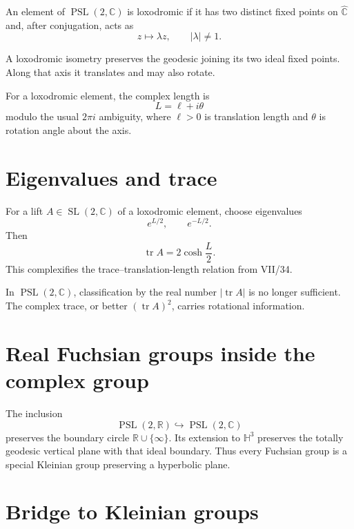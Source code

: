 \begin{definition}\label{def:vii36-loxodromic}
An element of \(\operatorname{PSL}(2,\mathbb C)\) is loxodromic if it has two distinct fixed points on \(\widehat{\mathbb C}\) and, after conjugation, acts as
\[
z\mapsto \lambda z,\qquad |\lambda|\ne1.
\]
\end{definition}

A loxodromic isometry preserves the geodesic joining its two ideal fixed points.  Along that axis it translates and may also rotate.

\begin{definition}\label{def:vii36-complex-length}
For a loxodromic element, the complex length is
\[
L=\ell+i\theta
\]
modulo the usual \(2\pi i\) ambiguity, where \(\ell>0\) is translation length and \(\theta\) is rotation angle about the axis.
\end{definition}


\section{Eigenvalues and trace}

For a lift \(A\in\operatorname{SL}(2,\mathbb C)\) of a loxodromic element, choose eigenvalues
\[
e^{L/2},\qquad e^{-L/2}.
\]
Then
\[
\operatorname{tr}A=2\cosh\frac L2.
\]
This complexifies the trace--translation-length relation from VII/34.

\begin{remark}
In \(\operatorname{PSL}(2,\mathbb C)\), classification by the real number \(|\operatorname{tr}A|\) is no longer sufficient.  The complex trace, or better \((\operatorname{tr}A)^2\), carries rotational information.
\end{remark}


\section{Real Fuchsian groups inside the complex group}

The inclusion
\[
\operatorname{PSL}(2,\mathbb R)\hookrightarrow\operatorname{PSL}(2,\mathbb C)
\]
preserves the boundary circle \(\mathbb R\cup\{\infty\}\).  Its extension to \(\mathbb H^3\) preserves the totally geodesic vertical plane with that ideal boundary.  Thus every Fuchsian group is a special Kleinian group preserving a hyperbolic plane.


\section{Bridge to Kleinian groups}


